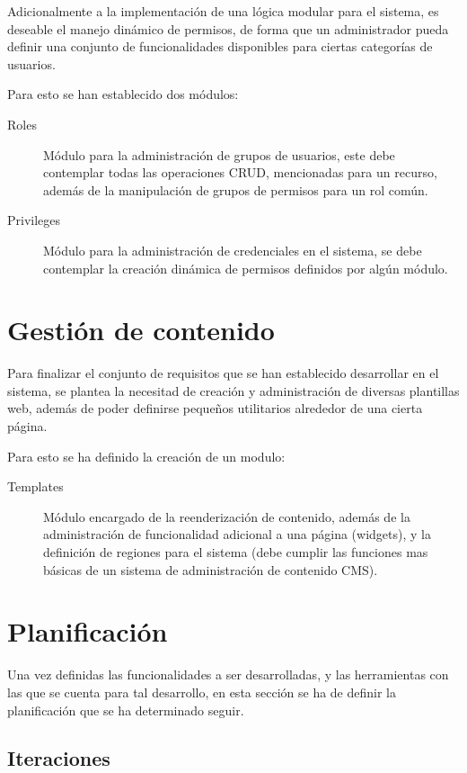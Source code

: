 Adicionalmente a la implementación de una lógica modular para el sistema, es
deseable el manejo dinámico de permisos, de forma que un administrador pueda
definir una conjunto de funcionalidades disponibles para ciertas categorías de
usuarios.

Para esto se han establecido dos módulos:

\begin{description}
\item [Roles] Módulo para la administración de grupos de usuarios, este debe
contemplar todas las operaciones CRUD, mencionadas para un recurso, además de la
manipulación de grupos de permisos para un rol común.
\item [Privileges] Módulo para la administración de credenciales en el sistema,
se debe contemplar la creación dinámica de permisos definidos por algún módulo.
\end{description}

\section{Gestión de contenido}

Para finalizar el conjunto de requisitos que se han establecido desarrollar
en el sistema, se plantea la necesitad de creación y administración de
diversas plantillas web, además de poder definirse pequeños utilitarios
alrededor de una cierta página.

Para esto se ha definido la creación de un modulo:

\begin{description}
\item [Templates] Módulo encargado de la reenderización de contenido, además de
la administración de funcionalidad adicional a una página (widgets), y la
definición de regiones para el sistema (debe cumplir las funciones mas básicas
de un sistema de administración de contenido CMS).
\end{description}

\section{Planificación}

Una vez definidas las funcionalidades a ser desarrolladas, y las herramientas
con las que se cuenta para tal desarrollo, en esta sección se ha de definir la
planificación que se ha determinado seguir.

\subsection{Iteraciones}

